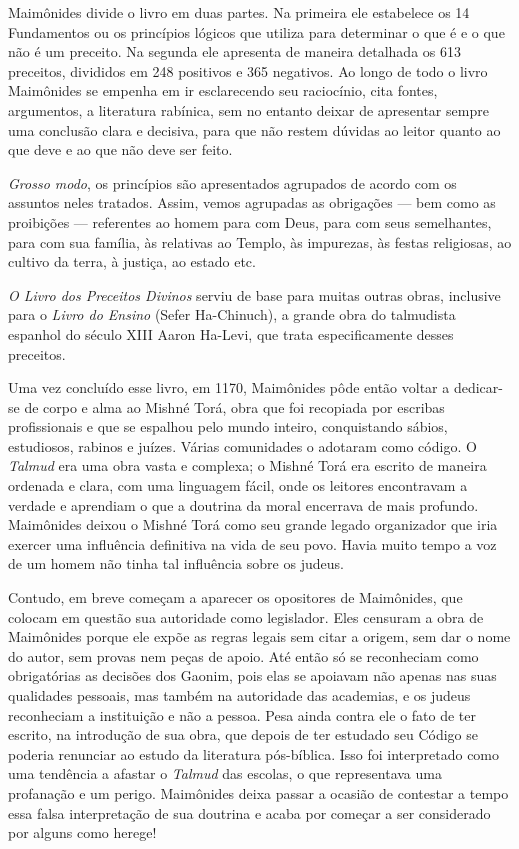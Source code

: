 Maimônides divide o livro em duas partes. Na primeira ele estabelece os
14 Fundamentos ou os princípios lógicos que utiliza para determinar o
que é e o que não é um preceito. Na segunda ele apresenta de maneira
detalhada os 613 preceitos, divididos em 248 positivos e 365 negativos.
Ao longo de todo o livro Maimônides se empenha em ir esclarecendo seu
raciocínio, cita fontes, argumentos, a literatura rabínica, sem no
entanto deixar de apresentar sempre uma conclusão clara e decisiva,
para que não restem dúvidas ao leitor quanto ao que deve e ao que não
deve ser feito.

\emph{Grosso modo}, os princípios são apresentados agrupados de acordo
com os assuntos neles tratados. Assim, vemos agrupadas as obrigações ---
bem como as proibições --- referentes ao homem para com Deus, para com
seus semelhantes, para com sua família, às relativas ao Templo, às
impurezas, às festas religiosas, ao cultivo da terra, à justiça, ao
estado etc.

\emph{O Livro dos Preceitos Divinos} serviu de base para muitas outras
obras, inclusive para o \emph{Livro do Ensino} (Sefer Ha-Chinuch), a
grande obra do talmudista espanhol do século XIII Aaron Ha-Levi, que
trata especificamente desses preceitos.


Uma vez concluído esse livro, em 1170, Maimônides pôde então voltar a
dedicar-se de corpo e alma ao Mishné Torá, obra que foi
recopiada por escribas profissionais e que se espalhou pelo mundo
inteiro, conquistando sábios, estudiosos, rabinos e juízes. Várias
comunidades o adotaram como código. O \emph{Talmud} era uma obra vasta
e complexa; o Mishné Torá era escrito de maneira ordenada e
clara, com uma linguagem fácil, onde os leitores encontravam a verdade
e aprendiam o que a doutrina da moral encerrava de mais profundo.
Maimônides deixou o Mishné Torá como seu grande legado
organizador que iria exercer uma influência definitiva na vida de seu
povo. Havia muito tempo a voz de um homem não tinha tal influência sobre
os judeus.

Contudo, em breve começam a aparecer os opositores de Maimônides, que
colocam em questão sua autoridade como legislador. Eles censuram a obra
de Maimônides porque ele expõe as regras legais sem citar a origem, sem
dar o nome do autor, sem provas nem peças de apoio. Até então só se
reconheciam como obrigatórias as decisões dos Gaonim, pois elas se
apoiavam não apenas nas suas qualidades pessoais, mas também na
autoridade das academias, e os judeus reconheciam a instituição e não a
pessoa. Pesa ainda contra ele o fato de ter escrito, na introdução de
sua obra, que depois de ter estudado seu Código se poderia renunciar ao
estudo da literatura pós-bíblica. Isso foi interpretado como uma
tendência a afastar o \emph{Talmud} das escolas, o que representava uma
profanação e um perigo. Maimônides deixa passar a ocasião de contestar a
tempo essa falsa interpretação de sua doutrina e acaba por começar a
ser considerado por alguns como herege!

